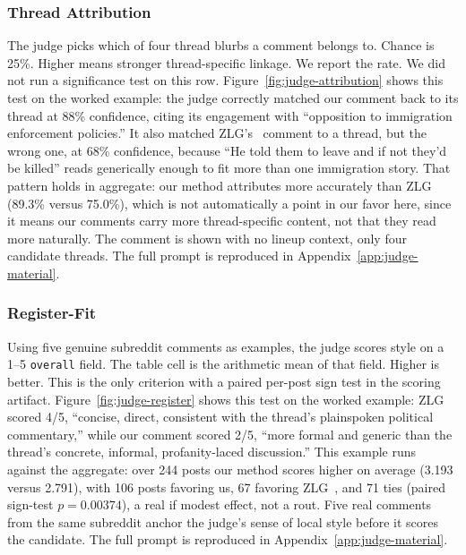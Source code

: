 \subsubsection{Thread Attribution}
The judge picks which of four thread blurbs a comment belongs to.
Chance is 25\%.
Higher means stronger thread-specific linkage.
We report the rate.
We did not run a significance test on this row.
Figure~\ref{fig:judge-attribution} shows this test on the worked example: the judge correctly matched our comment back to its thread at 88\% confidence, citing its engagement with ``opposition to immigration enforcement policies.''
It also matched ZLG's~\cite{lin2024zero} comment to a thread, but the wrong one, at 68\% confidence, because ``He told them to leave and if not they'd be killed'' reads generically enough to fit more than one immigration story.
That pattern holds in aggregate: our method attributes more accurately than ZLG~\cite{lin2024zero} (89.3\% versus 75.0\%), which is not automatically a point in our favor here, since it means our comments carry more thread-specific content, not that they read more naturally.
The comment is shown with no lineup context, only four candidate threads.
The full prompt is reproduced in Appendix~\ref{app:judge-material}.



\subsubsection{Register-Fit}
Using five genuine subreddit comments as examples, the judge scores style on a 1--5 \texttt{overall} field.
The table cell is the arithmetic mean of that field.
Higher is better.
This is the only criterion with a paired per-post sign test in the scoring artifact.
Figure~\ref{fig:judge-register} shows this test on the worked example: ZLG~\cite{lin2024zero} scored 4/5, ``concise, direct, consistent with the thread's plainspoken political commentary,'' while our comment scored 2/5, ``more formal and generic than the thread's concrete, informal, profanity-laced discussion.''
This example runs against the aggregate: over 244 posts our method scores higher on average (3.193 versus 2.791), with 106 posts favoring us, 67 favoring ZLG~\cite{lin2024zero}, and 71 ties (paired sign-test $p=0.00374$), a real if modest effect, not a rout.
Five real comments from the same subreddit anchor the judge's sense of local style before it scores the candidate.
The full prompt is reproduced in Appendix~\ref{app:judge-material}.



